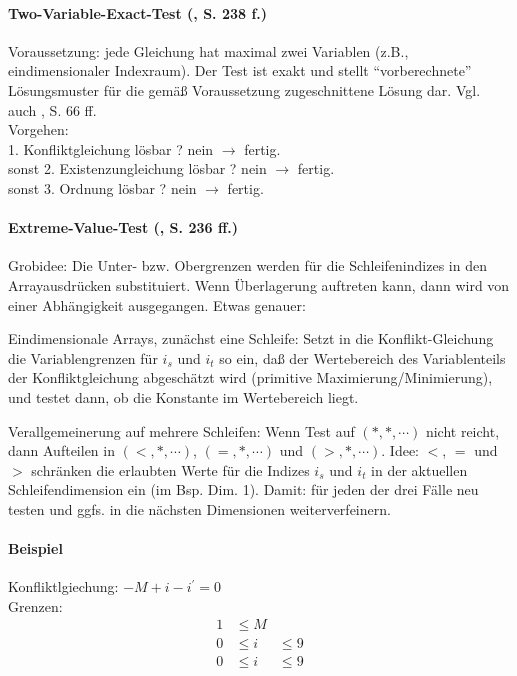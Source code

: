 \paragraph{Two-Variable-Exact-Test (\cite{Wol95}, S. 238  f.)}

Voraussetzung: jede Gleichung hat maximal zwei Variablen (z.B.,
eindimensionaler Indexraum). Der Test ist exakt und stellt
``vorberechnete'' Lösungsmuster für die gemäß Voraussetzung
zugeschnittene Lösung dar. Vgl. auch \cite{Ban93}, S. 66 ff.\\
Vorgehen:\\
1. Konfliktgleichung lösbar ? nein \( \rightarrow  \) fertig. \\
sonst 2. Existenzungleichung lösbar ? nein \( \rightarrow \) fertig. \\
sonst 3. Ordnung lösbar ? nein \( \rightarrow \) fertig.


\paragraph{Extreme-Value-Test (\cite{Wol95}, S. 236   ff.)}

Grobidee: Die Unter- bzw. Obergrenzen werden für die Schleifenindizes in
den Arrayausdrücken substituiert. Wenn Überlagerung auftreten kann, dann
wird von einer Abhängigkeit ausgegangen. Etwas genauer:

Eindimensionale Arrays, zunächst eine Schleife: Setzt in die
Konflikt-Gleichung die Variablengrenzen für $i_s$ und $i_t$ so ein, daß
der Wertebereich des Variablenteils der Konfliktgleichung abgeschätzt
wird (primitive Maximierung/Minimierung), und testet dann, ob die
Konstante im Wertebereich liegt.

Verallgemeinerung auf mehrere Schleifen: Wenn Test auf $(*,*,\cdots)$
nicht reicht, dann Aufteilen in $(<,*,\cdots)$, $(=,*,\cdots)$ und
$(>,*,\cdots)$. Idee: $<$, $=$ und $>$ schränken die erlaubten Werte für
die Indizes $i_s$ und $i_t$ in der aktuellen Schleifendimension ein (im
Bsp. Dim. 1). Damit: für jeden der drei Fälle neu testen und ggfs. in
die nächsten Dimensionen weiterverfeinern.

\paragraph{Beispiel}
Konfliktlgiechung: \( -M + i - i^\prime = 0 \) \\
Grenzen:
\begin{align*}
   1 & \leq M \\
   0 & \leq i & \leq 9 \\
   0 & \leq i & \leq 9
\end{align*}

